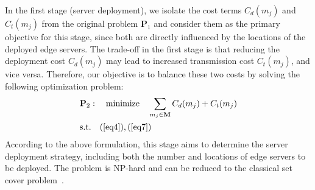 \documentclass[10pt, conference, letterpaper]{IEEEtran}
\begin{document}
In the first stage (server deployment), we isolate the cost terms $C_{d}(m_j)$ and $C_{t}(m_j)$ from the original problem $\textbf{P}_1$ and consider them as the primary objective for this stage, since both are directly influenced by the locations of the deployed edge servers. The trade-off in the first stage is that reducing the deployment cost $C_{d}(m_j)$ may lead to increased transmission cost $C_{t}(m_j)$, and vice versa. Therefore, our objective is to balance these two costs by solving the following optimization problem:
\begin{align}
&\textbf{P}_2:\quad \text{minimize} \quad \sum_{m_j\in \textbf{M}}C_{d}(m_j) + C_{t}(m_j) \label{eq:p2_obj} \\
&\text{s.t.} \quad (\ref{eq4}), (\ref{eq7}) \label{eq:p2_constraints}
\end{align}
According to the above formulation, this stage aims to determine the server deployment strategy, including both the number and locations of edge servers to be deployed. The problem is NP-hard and can be reduced to the classical set cover problem~\cite{b29,b30}. 
\end{document}
